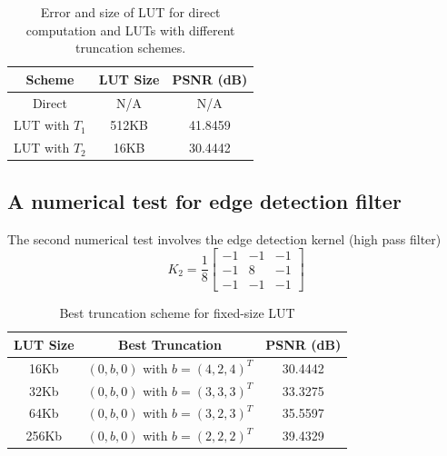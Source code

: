 \documentclass[12pt]{amsart}
\theoremstyle{definition}
\theoremstyle{remark}
\numberwithin{thm}{section}
\begin{document}
\begin{center}
\begin{table}[h]
	 
    \begin{tabular}{ | c | c| c |}
    \hline
    Scheme & LUT Size & PSNR (dB) \\ \hline
    Direct & N/A & N/A  \\ \hline
    LUT with $T_1$ & 512KB & 41.8459 \\ \hline
    LUT with $T_2$ & 16KB & 30.4442 \\ \hline   
    \end{tabular}
    \bigskip
    
    \caption{Error and size of LUT for direct computation and LUTs with different truncation schemes.}
    \label{tbl:low_pass}
\end{table} 
\end{center}

\subsection{A numerical test for edge detection filter}

The second numerical test involves the edge detection kernel (high pass filter)
$$
K_2=\frac{1}{8}
\begin{bmatrix}
-1 & -1 & -1\\
-1 &  8 & -1\\
-1 & -1 & -1
\end{bmatrix}
$$
\begin{center}
\begin{table}[h]
	
    \begin{tabular}{ | c | c | c | }
    \hline
    LUT Size & Best Truncation & PSNR (dB) \\ \hline
    16Kb& $(0,b,0)$ with $b=(4,2,4)^T$ & 30.4442 \\ \hline
    32Kb& $(0,b,0)$ with $b=(3,3,3)^T$ & 33.3275 \\ \hline 
    64Kb& $(0,b,0)$ with $b=(3,2,3)^T$ & 35.5597 \\ \hline 
    256Kb& $(0,b,0)$ with $b=(2,2,2)^T$ & 39.4329 \\ \hline 
    \end{tabular}
    \bigskip
    
    \caption{Best truncation scheme for fixed-size LUT}
    \label{tbl:optimization}
\end{table} 
\end{center}
\end{document}
